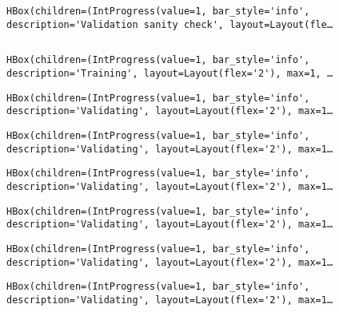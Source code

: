 \documentclass[10pt]{article}
\begin{document}
    
    \begin{verbatim}
HBox(children=(IntProgress(value=1, bar_style='info', description='Validation sanity check', layout=Layout(fle…
    \end{verbatim}

    
    \begin{Verbatim}[commandchars=\\\{\}]

    \end{Verbatim}

    
    \begin{verbatim}
HBox(children=(IntProgress(value=1, bar_style='info', description='Training', layout=Layout(flex='2'), max=1, …
    \end{verbatim}

    
    
    \begin{verbatim}
HBox(children=(IntProgress(value=1, bar_style='info', description='Validating', layout=Layout(flex='2'), max=1…
    \end{verbatim}

    
    
    \begin{verbatim}
HBox(children=(IntProgress(value=1, bar_style='info', description='Validating', layout=Layout(flex='2'), max=1…
    \end{verbatim}

    
    
    \begin{verbatim}
HBox(children=(IntProgress(value=1, bar_style='info', description='Validating', layout=Layout(flex='2'), max=1…
    \end{verbatim}

    
    
    \begin{verbatim}
HBox(children=(IntProgress(value=1, bar_style='info', description='Validating', layout=Layout(flex='2'), max=1…
    \end{verbatim}

    
    
    \begin{verbatim}
HBox(children=(IntProgress(value=1, bar_style='info', description='Validating', layout=Layout(flex='2'), max=1…
    \end{verbatim}

    
    
    \begin{verbatim}
HBox(children=(IntProgress(value=1, bar_style='info', description='Validating', layout=Layout(flex='2'), max=1…
    \end{verbatim}
\end{document}
